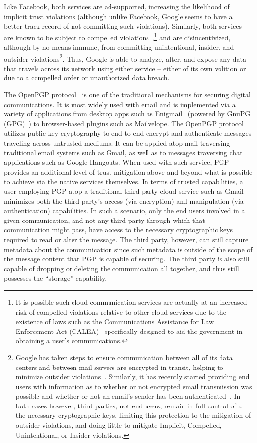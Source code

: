 Like Facebook, both services are ad-supported, increasing the
likelihood of implicit trust violations (although unlike Facebook,
Google seems to have a better track record of not committing such
violations). Similarly, both services are known to be subject to
compelled violations~\cite{google-transparency},\footnote{It is
  possible such cloud communication services are actually at an
  increased risk of compelled violations relative to other cloud
  services due to the existence of laws such as the Communications
  Assistance for Law Enforcement Act (CALEA)~\cite{calea-usc,
    calea-fcc} specifically designed to aid the government in
  obtaining a user's communications.} and are disincentivized,
although by no means immune, from committing unintentional, insider,
and outsider violations\footnote{Google has taken steps to ensure
  communication between all of its data centers and between mail
  servers are encrypted in transit, helping to minimize outsider
  violations~\cite{gmail-blog-encryption}. Similarly, it has recently
  started providing end users with information as to whether or not
  encrypted email transmission was possible and whether or not an
  email's sender has been authenticated~\cite{gmail-blog-indicators}.
  In both cases however, third parties, not end users, remain in full
  control of all the necessary cryptographic keys, limiting this
  protection to the mitigation of outsider violations, and doing
  little to mitigate Implicit, Compelled, Unintentional, or Insider
  violations.}. Thus, Google is able to analyze, alter, and expose any
data that travels across its network using either service -- either of
its own volition or due to a compelled order or unauthorized data
breach.

The OpenPGP protocol~\cite{callas2007} is one of the traditional
mechanisms for securing digital communications. It is most widely used
with email and is implemented via a variety of applications from
desktop apps such as Enigmail~\cite{enigmail} (powered by GnuPG
(GPG)~\cite{gnupg}) to browser-based plugins such as
Mailvelope\cite{mailvelope}. The OpenPGP protocol utilizes public-key
cryptography to end-to-end encrypt and authenticate messages traveling
across untrusted mediums. It can be applied atop mail traversing
traditional email systems such as Gmail, as well as to messages
traversing chat applications such as Google Hangouts. When used with
such service, PGP provides an additional level of trust mitigation
above and beyond what is possible to achieve via the native services
themselves. In terms of trusted capabilities, a user employing PGP
atop a traditional third party cloud service such as Gmail minimizes
both the third party's access (via encryption) and manipulation (via
authentication) capabilities. In such a scenario, only the end users
involved in a given communication, and not any third party through
which that communication might pass, have access to the necessary
cryptographic keys required to read or alter the message. The third
party, however, can still capture metadata about the communication
since such metadata is outside of the scope of the message content
that PGP is capable of securing. The third party is also still capable
of dropping or deleting the communication all together, and thus still
possesses the ``storage'' capability.

